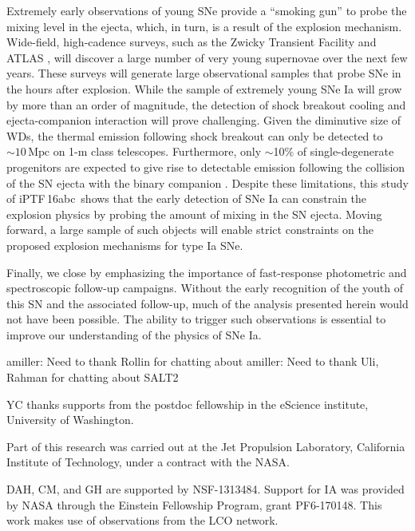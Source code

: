 \documentclass[twocolumn]{aastex61}
\newcommand{\abc}{iPTF\,16abc}
\newcommand{\amiller}[1]{{\color{blue} amiller: {#1}}}
\begin{document}
Extremely early observations of young SNe provide a ``smoking
gun'' to probe the mixing level in the ejecta, which, in turn, is 
a result of the explosion mechanism. Wide-field, high-cadence surveys, such as the Zwicky Transient Facility \citep{2016PASP..128h4501B} and ATLAS \citep{2011PASP..123...58T,2013RSPTA.37120269T}, will discover a large number of very young supernovae over the next few years. These surveys will generate large observational samples that probe SNe in the hours after explosion. While the sample of extremely young SNe Ia will grow by more than an order of magnitude, the detection of shock breakout cooling and ejecta-companion interaction will prove challenging. Given the diminutive size of WDs, the thermal emission following shock breakout can only be detected to $\sim 10\,\mathrm{Mpc}$ on 1-m class telescopes. Furthermore, only $\sim$10\% of single-degenerate progenitors are expected to give rise to detectable emission following the collision of the SN ejecta with the binary companion \citep{2010ApJ...708.1025K}. Despite these limitations, this study of \abc\ shows that the early detection of SNe Ia can constrain the explosion physics by probing the amount of mixing in the SN ejecta. Moving forward, a large sample of such objects will enable strict constraints on the proposed explosion mechanisms for type Ia SNe.

Finally, we close by emphasizing the importance of fast-response photometric and spectroscopic follow-up campaigns. Without the early recognition of the youth of this SN and the associated follow-up, much of the analysis presented herein would not have been possible. The ability to trigger such observations is essential to improve our understanding of the physics of SNe Ia.

\acknowledgements

\amiller{Need to thank Rollin for chatting about }
\amiller{Need to thank Uli, Rahman for chatting about SALT2}


YC thanks supports from the postdoc fellowship in the eScience
institute, University of Washington.

Part of this research was carried out at the Jet Propulsion Laboratory, California Institute of Technology, under a contract with the NASA.

DAH, CM, and GH are supported by NSF-1313484. Support for IA was provided by NASA through the Einstein Fellowship Program, grant PF6-170148. This work makes use of observations from the LCO network.




\end{document}
